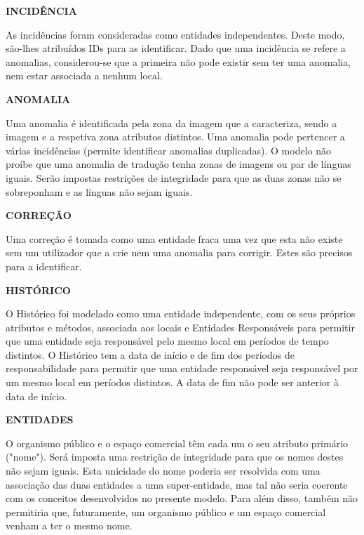 \documentclass[10pt]{report}
\begin{document}
    \vspace*{10mm}
    \noindent\textbf{INCIDÊNCIA}

        As incidências foram consideradas como entidades independentes. Deste modo, são-lhes atribuídos IDs para as identificar.
        Dado que uma incidência se refere a anomalias, considerou-se que a primeira não pode existir sem ter uma anomalia, nem estar associada a nenhum local.
    
    \vspace*{10mm}
    \noindent\textbf{ANOMALIA}

        
        Uma anomalia é identificada pela zona da imagem que a caracteriza, sendo a imagem e a respetiva zona atributos distintos.
        Uma anomalia pode pertencer a várias incidências (permite identificar anomalias duplicadas).
        O modelo não proíbe que uma anomalia de tradução tenha zonas de imagens ou par de línguas iguais. Serão impostas restrições de integridade para que as duas zonas não se sobreponham e as línguas não sejam iguais.
    
    \vspace*{10mm}
    \noindent\textbf{CORREÇÃO}

        
        Uma correção é tomada como uma entidade fraca uma vez que esta não existe sem um utilizador que a crie nem uma anomalia para corrigir. Estes são precisos para a identificar.
    

    \vspace*{10mm}
    \noindent\textbf{HISTÓRICO}

        
        O Histórico foi modelado como uma entidade independente, com os seus próprios atributos e métodos, associada aos locais e Entidades Responsáveis para permitir que uma entidade seja responsável pelo mesmo local em períodos de tempo distintos.
        O Histórico tem a data de início e de fim dos períodos de responsabilidade para permitir que uma entidade responsável seja responsável por um mesmo local em períodos distintos. A data de fim não pode ser anterior à data de início.
    

    \vspace*{10mm}
    \noindent\textbf{ENTIDADES}

        
        O organismo público e o espaço comercial têm cada um o seu atributo primário ("nome"). Será imposta uma restrição de integridade para que os 
        nomes destes não sejam iguais. Esta unicidade do nome poderia ser resolvida com uma associação das duas entidades a uma super-entidade, 
        mas tal não seria coerente com os conceitos desenvolvidos no presente modelo. Para além disso, também não permitiria que, 
        futuramente, um organismo público e um espaço comercial venham a ter o mesmo nome.
    
\end{document}
